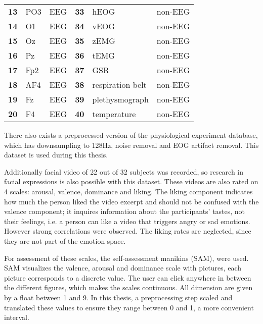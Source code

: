 \begin{table}[]
\begin{tabular}{lll|lll}
\textbf{13}      & PO3           & EEG               & \textbf{33}      & hEOG             & non-EEG           \\
\textbf{14}      & O1            & EEG               & \textbf{34}      & vEOG             & non-EEG           \\
\textbf{15}      & Oz            & EEG               & \textbf{35}      & zEMG             & non-EEG           \\
\textbf{16}      & Pz            & EEG               & \textbf{36}      & tEMG             & non-EEG           \\
\textbf{17}      & Fp2           & EEG               & \textbf{37}      & GSR              & non-EEG           \\
\textbf{18}      & AF4           & EEG               & \textbf{38}      & respiration belt & non-EEG           \\
\textbf{19}      & Fz            & EEG               & \textbf{39}      & plethysmograph   & non-EEG           \\
\textbf{20}      & F4            & EEG               & \textbf{40}      & temperature      & non-EEG          
\end{tabular}
\end{table}

\npar

There also exists a preprocessed version of the physiological experiment database, which has downsampling to 128Hz, noise removal and EOG artifact removal. This dataset is used during this thesis.

\npar

Additionally facial video of 22 out of 32 subjects was recorded, so research in facial expressions is also possible with this dataset. These videos are also rated on 4 scales: arousal, valence, dominance and liking. The liking component indicates how much the person liked the video excerpt and should not be confused with the valence component; it inquires information about the participants' tastes, not their feelings, i.e. a person can like a video that triggers angry or sad emotions. However strong correlations were observed\citep{DEAP}. The liking rates are neglected, since they are not part of the emotion space.
\npar

For assessment of these scales, the self-assessment manikins (SAM), were used\cite{DEAP}. SAM visualizes the valence, arousal and dominance scale with pictures, each picture corresponds to a discrete value. The user can click anywhere in between the different figures, which makes the scales continuous. All dimension are given by a float between 1 and 9. In this thesis, a preprocessing step scaled and translated these values to ensure they range between 0 and 1, a more convenient interval.

